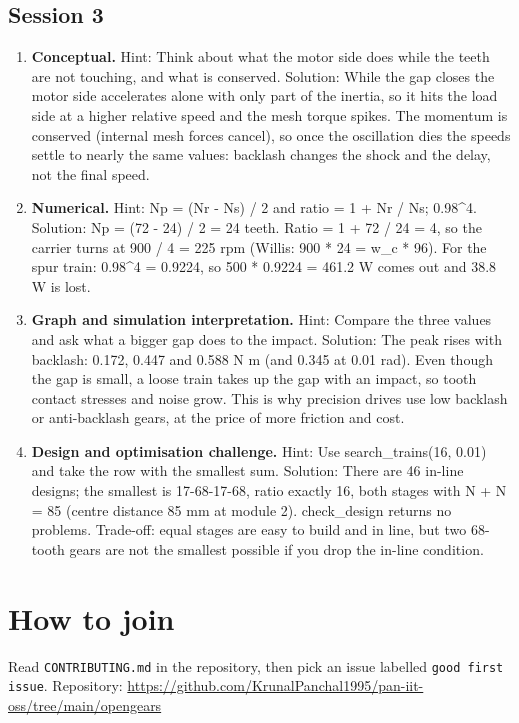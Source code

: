 \documentclass[11pt,a4paper]{article}
\begin{document}
\subsection*{Session 3}
\begin{enumerate}[nosep]
\item \textbf{Conceptual.} Hint: Think about what the motor side does while the teeth are not touching, and what is conserved. Solution: While the gap closes the motor side accelerates alone with only part of the inertia, so it hits the load side at a higher relative speed and the mesh torque spikes. The momentum is conserved (internal mesh forces cancel), so once the oscillation dies the speeds settle to nearly the same values: backlash changes the shock and the delay, not the final speed.
\item \textbf{Numerical.} Hint: Np = (Nr - Ns) / 2 and ratio = 1 + Nr / Ns; 0.98\textasciicircum{}4. Solution: Np = (72 - 24) / 2 = 24 teeth. Ratio = 1 + 72 / 24 = 4, so the carrier turns at 900 / 4 = 225 rpm (Willis: 900 * 24 = w\_c * 96). For the spur train: 0.98\textasciicircum{}4 = 0.9224, so 500 * 0.9224 = 461.2 W comes out and 38.8 W is lost.
\item \textbf{Graph and simulation interpretation.} Hint: Compare the three values and ask what a bigger gap does to the impact. Solution: The peak rises with backlash: 0.172, 0.447 and 0.588 N m (and 0.345 at 0.01 rad). Even though the gap is small, a loose train takes up the gap with an impact, so tooth contact stresses and noise grow. This is why precision drives use low backlash or anti-backlash gears, at the price of more friction and cost.
\item \textbf{Design and optimisation challenge.} Hint: Use search\_trains(16, 0.01) and take the row with the smallest sum. Solution: There are 46 in-line designs; the smallest is 17-68-17-68, ratio exactly 16, both stages with N + N = 85 (centre distance 85 mm at module 2). check\_design returns no problems. Trade-off: equal stages are easy to build and in line, but two 68-tooth gears are not the smallest possible if you drop the in-line condition.
\end{enumerate}

\section{How to join}
Read \texttt{CONTRIBUTING.md} in the repository, then pick an issue labelled \texttt{good first issue}. Repository: \url{https://github.com/KrunalPanchal1995/pan-iit-oss/tree/main/opengears}
\end{document}
